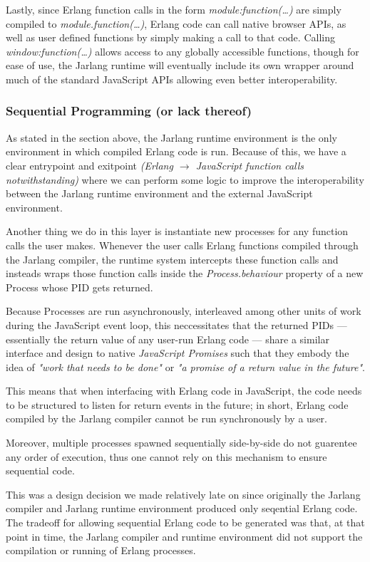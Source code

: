 \documentclass[twoside,12pt,titlepage,a4paper]{article}
\begin{document}
Lastly, since Erlang function calls in the form \textit{module:function(\dots)} are simply compiled to \textit{module.function(\dots)}, Erlang code can call native browser APIs, as well as user defined functions by simply making a call to that code. Calling \textit{window:function(\dots)} allows access to any globally accessible functions, though for ease of use, the Jarlang runtime will eventually include its own wrapper around much of the standard JavaScript APIs allowing even better interoperability.

\subsubsection{Sequential Programming (or lack thereof)}
As stated in the section above, the Jarlang runtime environment is the only environment in which compiled Erlang code is run. Because of this, we have a clear entrypoint and exitpoint \textit{(Erlang $\rightarrow$ JavaScript function calls notwithstanding)} where we can perform some logic to improve the interoperability between the Jarlang runtime environment and the external JavaScript environment.

Another thing we do in this layer is instantiate new processes for any function calls the user makes. Whenever the user calls Erlang functions compiled through the Jarlang compiler, the runtime system intercepts these function calls and insteads wraps those function calls inside the \textit{Process.behaviour} property of a new Process whose PID gets returned.

Because Processes are run asynchronously, interleaved among other units of work during the JavaScript event loop, this neccessitates that the returned PIDs --- essentially the return value of any user-run Erlang code --- share a similar interface and design to native \textit{JavaScript Promises} such that they embody the idea of \textit{"work that needs to be done"} or \textit{"a promise of a return value in the future"}.

This means that when interfacing with Erlang code in JavaScript, the code needs to be structured to listen for return events in the future; in short, Erlang code compiled by the Jarlang compiler cannot be run synchronously by a user.

Moreover, multiple processes spawned sequentially side-by-side do not guarentee any order of execution, thus one cannot rely on this mechanism to ensure sequential code.

This was a design decision we made relatively late on since originally the Jarlang compiler and Jarlang runtime environment produced only seqential Erlang code. The tradeoff for allowing sequential Erlang code to be generated was that, at that point in time, the Jarlang compiler and runtime environment did not support the compilation or running of Erlang processes.
\end{document}

